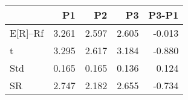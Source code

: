 \begin{tabular}{lrrrr}
\toprule
 & P1 & P2 & P3 & P3-P1 \\
\midrule
E[R]--Rf & 3.261 & 2.597 & 2.605 & -0.013 \\
t & 3.295 & 2.617 & 3.184 & -0.880 \\
Std & 0.165 & 0.165 & 0.136 & 0.124 \\
SR & 2.747 & 2.182 & 2.655 & -0.734 \\
\bottomrule
\end{tabular}
